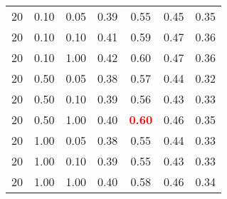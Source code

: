 \begin{tabular}{lllcccc}
20 & 0.10 & 0.05 & 0.39 & 0.55 & 0.45 & 0.35 \\ 
20 & 0.10 & 0.10 & 0.41 & 0.59 & 0.47 & 0.36 \\ 
20 & 0.10 & 1.00 & 0.42 & 0.60 & 0.47 & 0.36 \\ 
20 & 0.50 & 0.05 & 0.38 & 0.57 & 0.44 & 0.32 \\ 
20 & 0.50 & 0.10 & 0.39 & 0.56 & 0.43 & 0.33 \\ 
20 & 0.50 & 1.00 & 0.40 & \textbf{\textcolor{red}{0.60}} & 0.46 & 0.35 \\ 
20 & 1.00 & 0.05 & 0.38 & 0.55 & 0.44 & 0.33 \\ 
20 & 1.00 & 0.10 & 0.39 & 0.55 & 0.43 & 0.33 \\ 
20 & 1.00 & 1.00 & 0.40 & 0.58 & 0.46 & 0.34 \\ 
\end{tabular} 
